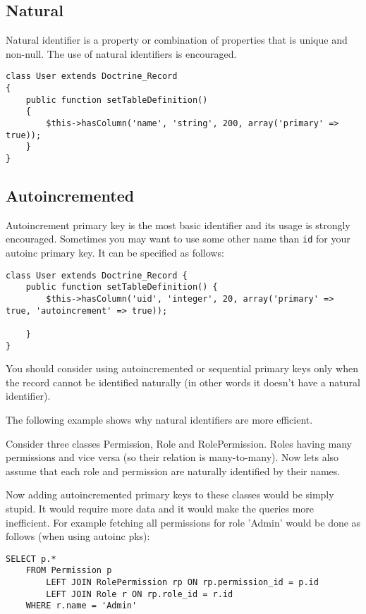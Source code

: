 \documentclass[11pt,a4paper]{report}
\begin{document}
\subsection{Natural}
Natural identifier is a property or combination of properties that is unique and non-null. The use of natural identifiers is encouraged.

\begin{verbatim}
class User extends Doctrine_Record
{
    public function setTableDefinition()
    {
        $this->hasColumn('name', 'string', 200, array('primary' => true));
    }
}
\end{verbatim}

\subsection{Autoincremented}
Autoincrement primary key is the most basic identifier and its usage is strongly encouraged. Sometimes you may want to use some other name than \texttt{id} for your autoinc primary key. It can be specified as follows:

\begin{verbatim}
class User extends Doctrine_Record {
    public function setTableDefinition() {
        $this->hasColumn('uid', 'integer', 20, array('primary' => true, 'autoincrement' => true));

    }
}
\end{verbatim}

You should consider using autoincremented or sequential primary keys only when the record cannot be identified naturally (in other words it doesn't have a natural identifier).

The following example shows why natural identifiers are more efficient.

Consider three classes Permission, Role and RolePermission. Roles having many permissions and vice versa (so their relation is many-to-many). Now lets also assume that each role and permission are naturally identified by their names.

Now adding autoincremented primary keys to these classes would be simply stupid. It would require more data and it would make the queries more inefficient. For example fetching all permissions for role 'Admin' would be done as follows (when using autoinc pks):

\begin{verbatim}
SELECT p.*
    FROM Permission p
        LEFT JOIN RolePermission rp ON rp.permission_id = p.id
        LEFT JOIN Role r ON rp.role_id = r.id
    WHERE r.name = 'Admin'
\end{verbatim}
\end{document}
